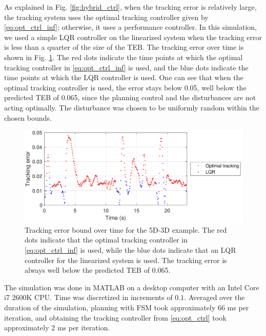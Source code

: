 As explained in Fig. \ref{fig:hybrid_ctrl}, when the tracking error is relatively large, the tracking system uses the optimal tracking controller given by \eqref{eq:opt_ctrl_inf}; otherwise, it uses a performance controller. 
In this simulation, we used a simple LQR controller on the linearized system when the tracking error is less than a quarter of the size of the TEB.
The tracking error over time is shown in Fig. \ref{fig:P5D_Dubins_tracking_error}.
The red dots indicate the time points at which the optimal tracking controller in \eqref{eq:opt_ctrl_inf} is used, and the blue dots indicate the time points at which the LQR controller is used. 
One can see that when the optimal tracking controller is used, the error stays below 0.05, well below the predicted TEB of 0.065, since the planning control and the disturbances are not acting optimally.
The disturbance was chosen to be uniformly random within the chosen bounds.

\begin{figure}
  \includegraphics[width=\columnwidth]{fig/P5D_Dubins/tracking_error}
  \caption{Tracking error bound over time for the 5D-3D example. The red dots indicate that the optimal tracking controller in \eqref{eq:opt_ctrl_inf} is used, while the blue dots indicate that an LQR controller for the linearized system is used. The tracking error is always well below the predicted TEB of 0.065.}
  \label{fig:P5D_Dubins_tracking_error}
\end{figure}

The simulation was done in MATLAB on a desktop computer with an Intel Core i7 2600K CPU.
Time was discretized in increments of $0.1$.
Averaged over the duration of the simulation, planning with FSM took approximately $66$ ms per iteration, and obtaining the tracking controller from \eqref{eq:opt_ctrl} took approximately $2$ ms per iteration.

